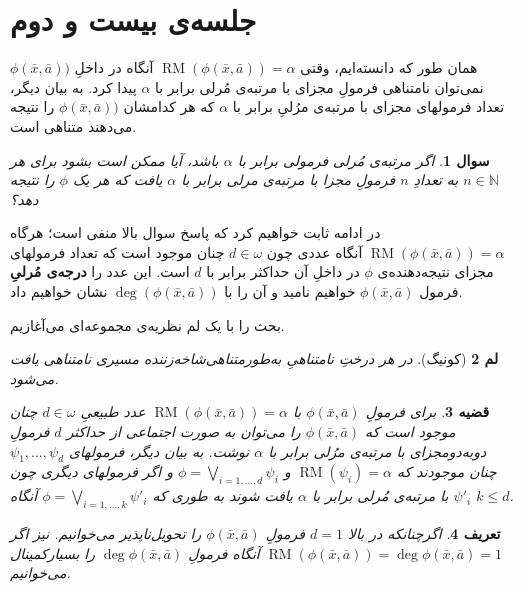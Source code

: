 \documentclass[12pt,a4paper]{report}
\theoremstyle{colorhead}
\newtheorem{thm}{قضیه}
\newtheorem{defn}[thm]{تعریف}
\newtheorem{soal}[thm]{سوال}
\newtheorem{lem}[thm]{لم}
\DeclareMathOperator{\RM}{RM}
\begin{document}
\section{جلسه‌ی بیست و دوم}
همان طور که دانسته‌ایم،
وقتی
$\RM(\phi(\bar{x},\bar{a}))=\alpha$
آنگاه در داخلِ
$\phi(\bar{x},\bar{a}))$
نمی‌توان نامتناهی فرمولِ مجزای با مرتبه‌ی مُرلی برابر با 
$\alpha$
پیدا کرد. به بیان دیگر، تعداد فرمولهای مجزای با مرتبه‌ی مرُلیِ برابر با 
$\alpha$
که هر کدامشان
$\phi(\bar{x},\bar{a}))$
را نتیجه می‌دهند متناهی است. 
\begin{soal}
اگر مرتبه‌‌ی مُرلی فرمولی برابر با 
$\alpha$
باشد، آیا ممکن است بشود برای هر
$n\in \mathbb{N}$
به تعدادِ
$n$
فرمولِ مجزا با مرتبه‌ی مرلی برابر با
$\alpha$
 یافت که هر یک
$\phi$
را نتیجه دهد؟
	\end{soal}
در ادامه ثابت خواهیم کرد که پاسخ سوال بالا منفی است؛ هرگاه
$\RM(\phi(\bar{x},\bar{a}))=\alpha$
آنگاه عددی چون
$d\in \omega$
چنان موجود است که تعداد فرمولهای مجزای نتیجه‌دهنده‌ی
$\phi$
در داخلِ آن حداکثر برابر با 
$d$
است. این عدد را 
\textbf{درجه‌ی مُرلیِ}
فرمول
$\phi(\bar{x},\bar{a})$
خواهیم نامید و آن را با
$\deg(\phi(\bar{x},\bar{a}))$
نشان خواهیم داد.
\par 
بحث را با یک لم نظریه‌ی مجموعه‌ای می‌آغازیم.
\begin{lem}[کونیگ]
\label{koenig}
در 	هر درختِ نامتناهیِ به‌طور‌متناهی‌شاخه‌زننده  مسیری نامتناهی یافت می‌شود. 
	\end{lem}
\begin{thm}
\label{degree}
	برای فرمولِ
	$\phi(\bar{x},\bar{a})$
	با
	$\RM(\phi(\bar{x},\bar{a}))=\alpha$
	عدد طبیعیِ 
	$d\in \omega$
	چنان موجود است که 
	$\phi(\bar{x},\bar{a})$
	را می‌توان به صورت اجتماعی از حداکثر  
	$d$
	فرمولِ دوبه‌دومجزای با مرتبه‌ی مرُلی برابر با
	$\alpha$
	 نوشت. به بیان دیگر،  فرمولهای
	$\psi_1,\ldots,\psi_d$
	چنان موجودند که
	$\RM(\psi_i)=\alpha$
	و 
	$\phi=\bigvee_{i=1,\ldots,d} \psi_i$
و اگر فرمولهای دیگری چون
$\psi'_i$
با مرتبه‌ی مُرلی برابر با 
$\alpha$
یافت شوند به طوری که 
	$\phi=\bigvee_{i=1,\ldots,k} \psi'_i$
	آنگاه
	$k\leq d$.
	\end{thm}
\begin{defn}
اگرچنانکه در بالا
	$d=1$
	فرمولِ
	$\phi(\bar{x},\bar{a})$
	را تحویل‌ناپذیر
	 می‌خوانیم. نیز اگر
	$\RM(\phi(\bar{x},\bar{a}))=\deg\phi(\bar{x},\bar{a})=1$
	آنگاه فرمولِ
$	\deg\phi(\bar{x},\bar{a})$
را 
بسیار‌کمینال 
می‌خوانیم. 
	\end{defn}
\end{document}
